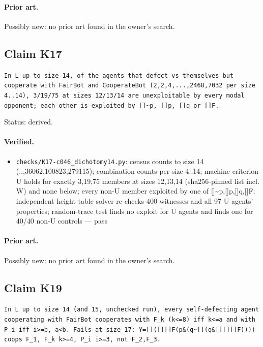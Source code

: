 \documentclass{article}
\begin{document}
\paragraph{Prior art.} Possibly new: no prior art found in the owner's search.

\subsection*{Claim K17}

\texttt{In L up to size 14, of the agents that defect vs themselves but cooperate with FairBot and CooperateBot (2,2,4,...,2468,7032 per size 4..14), 3/19/75 at sizes 12/13/14 are unexploitable by every modal opponent; each other is exploited by []\textasciitilde{}p, []p, []q or []F.}

Status: derived.

\paragraph{Verified.}
\begin{itemize}
\item \texttt{checks/K17-c046\_dichotomy14.py}: census counts to size 14 (..,36062,100823,279115); combination counts per size 4..14; machine criterion U holds for exactly 3,19,75 members at sizes 12,13,14 (sha256-pinned list incl. W) and none below; every non-U member exploited by one of []\textasciitilde{}p,[]p,[]q,[]F; independent height-table solver re-checks 400 witnesses and all 97 U agents' properties; random-trace test finds no exploit for U agents and finds one for 40/40 non-U controls --- pass
\end{itemize}

\paragraph{Prior art.} Possibly new: no prior art found in the owner's search.

\subsection*{Claim K19}

\texttt{In L up to size 14 (and 15, unchecked run), every self-defecting agent cooperating with FairBot cooperates with F\_k (k\textless{}=8) iff k\textless{}=a and with P\_i iff i\textgreater{}=b, a\textless{}b. Fails at size 17: Y=[]([][]F\textbar{}(p\&(q\textbar{}\textasciitilde{}[](q\&[][][]F)))) coops F\_1, F\_k k\textgreater{}=4, P\_i i\textgreater{}=3, not F\_2,F\_3.}
\end{document}
